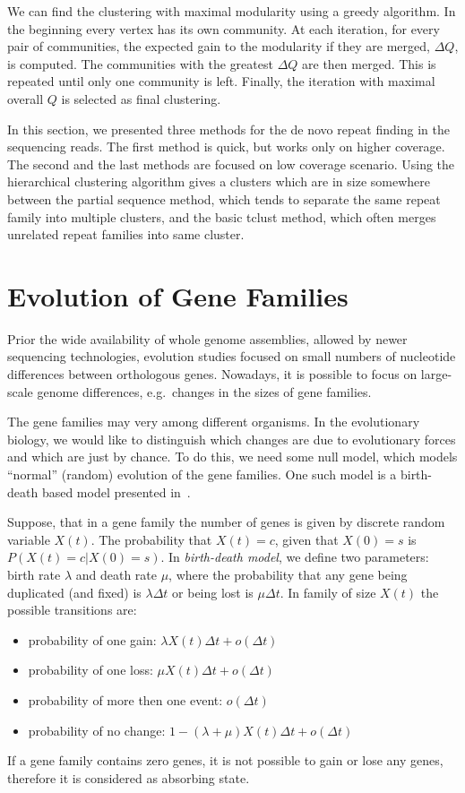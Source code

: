 We can find the clustering with maximal modularity using a greedy algorithm. In the beginning every vertex has its own community.
At each iteration, for every pair of communities, the expected gain to the modularity if they are merged, $\Delta Q$, is computed. The communities with the greatest $\Delta Q$ are then merged. This is repeated until only one community is left. Finally, the iteration with maximal overall $Q$ is selected as final clustering.

In this section, we presented three methods for the de novo repeat finding in the sequencing reads. The first method is quick, but works only on higher coverage. The second and the last methods are focused on low coverage scenario. Using the hierarchical clustering algorithm gives a clusters which are in size somewhere between the partial sequence method, which tends to separate the same repeat family into multiple clusters, and the basic tclust method, which often merges unrelated repeat families into same cluster.

\section{Evolution of Gene Families}

Prior the wide availability of whole genome assemblies, allowed by newer sequencing technologies, evolution studies focused on small numbers of nucleotide differences between orthologous genes. Nowadays, it is possible to focus on large-scale genome differences, e.g.\ changes in the sizes of gene families.

The gene families may very among different organisms. In the evolutionary biology, we would like to distinguish which changes are due to evolutionary forces and which are just by chance. To do this, we need some null model, which models ``normal'' (random) evolution of the gene families. One such model is a birth-death based model presented in~\cite{hahn2005estimating}.

Suppose, that in a gene family the number of genes is given by discrete random variable $X(t)$. The probability that $X(t) = c$, given that $X(0) = s$ is $P(X(t) = c | X(0) = s)$.
In \emph{birth-death model}, we define two parameters: birth rate $\lambda$ and death rate $\mu$, where the probability that any gene being duplicated (and fixed) is $\lambda \Delta t$ or being lost is $\mu \Delta t$. In family of size $X(t)$ the possible transitions are\cite{hahn2005estimating}:
\begin{itemize}
  \item probability of one gain: $\lambda X(t) \Delta t + o(\Delta t)$
  \item probability of one loss: $\mu X(t) \Delta t + o(\Delta t)$
  \item probability of more then one event: $o(\Delta t)$
  \item probability of no change: $1 - (\lambda + \mu) X(t) \Delta t + o(\Delta t)$
\end{itemize}
If a gene family contains zero genes, it is not possible to gain or lose any genes, therefore it is considered as absorbing state.

